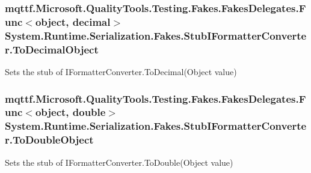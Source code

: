 \hypertarget{class_system_1_1_runtime_1_1_serialization_1_1_fakes_1_1_stub_i_formatter_converter_a7e4396e489695b79eb0eb3df6bfe6033}{
\subsubsection[{To\-Decimal\-Object}]{\setlength{\rightskip}{0pt plus 5cm}mqttf.\-Microsoft.\-Quality\-Tools.\-Testing.\-Fakes.\-Fakes\-Delegates.\-Func$<$object, decimal$>$ System.\-Runtime.\-Serialization.\-Fakes.\-Stub\-I\-Formatter\-Converter.\-To\-Decimal\-Object}}\label{class_system_1_1_runtime_1_1_serialization_1_1_fakes_1_1_stub_i_formatter_converter_a7e4396e489695b79eb0eb3df6bfe6033}


Sets the stub of I\-Formatter\-Converter.\-To\-Decimal(\-Object value)

\hypertarget{class_system_1_1_runtime_1_1_serialization_1_1_fakes_1_1_stub_i_formatter_converter_a7705a850e99590a74276d6712581977d}{
\subsubsection[{To\-Double\-Object}]{\setlength{\rightskip}{0pt plus 5cm}mqttf.\-Microsoft.\-Quality\-Tools.\-Testing.\-Fakes.\-Fakes\-Delegates.\-Func$<$object, double$>$ System.\-Runtime.\-Serialization.\-Fakes.\-Stub\-I\-Formatter\-Converter.\-To\-Double\-Object}}\label{class_system_1_1_runtime_1_1_serialization_1_1_fakes_1_1_stub_i_formatter_converter_a7705a850e99590a74276d6712581977d}


Sets the stub of I\-Formatter\-Converter.\-To\-Double(\-Object value)

